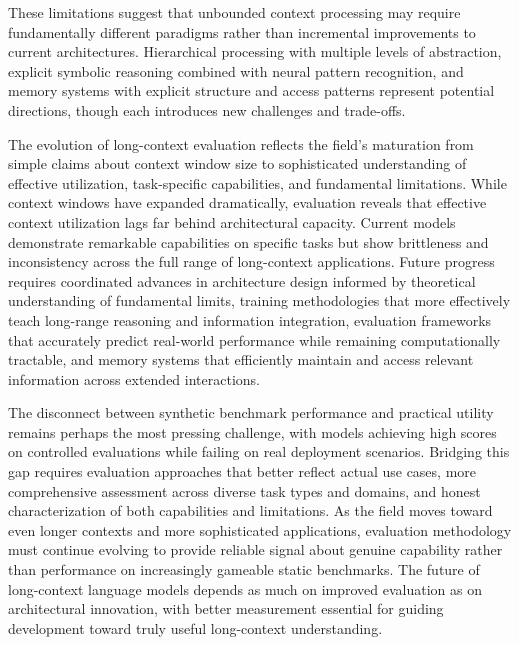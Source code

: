 \documentclass[11pt,letterpaper]{article}
\begin{document}
These limitations suggest that unbounded context processing may require fundamentally different paradigms rather than incremental improvements to current architectures. Hierarchical processing with multiple levels of abstraction, explicit symbolic reasoning combined with neural pattern recognition, and memory systems with explicit structure and access patterns represent potential directions, though each introduces new challenges and trade-offs.

The evolution of long-context evaluation reflects the field's maturation from simple claims about context window size to sophisticated understanding of effective utilization, task-specific capabilities, and fundamental limitations. While context windows have expanded dramatically, evaluation reveals that effective context utilization lags far behind architectural capacity. Current models demonstrate remarkable capabilities on specific tasks but show brittleness and inconsistency across the full range of long-context applications. Future progress requires coordinated advances in architecture design informed by theoretical understanding of fundamental limits, training methodologies that more effectively teach long-range reasoning and information integration, evaluation frameworks that accurately predict real-world performance while remaining computationally tractable, and memory systems that efficiently maintain and access relevant information across extended interactions.

The disconnect between synthetic benchmark performance and practical utility remains perhaps the most pressing challenge, with models achieving high scores on controlled evaluations while failing on real deployment scenarios. Bridging this gap requires evaluation approaches that better reflect actual use cases, more comprehensive assessment across diverse task types and domains, and honest characterization of both capabilities and limitations. As the field moves toward even longer contexts and more sophisticated applications, evaluation methodology must continue evolving to provide reliable signal about genuine capability rather than performance on increasingly gameable static benchmarks. The future of long-context language models depends as much on improved evaluation as on architectural innovation, with better measurement essential for guiding development toward truly useful long-context understanding.



\end{document}
